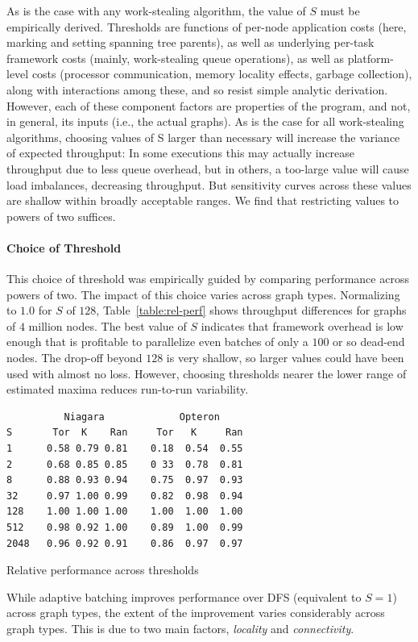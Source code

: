 As is the case with any work-stealing algorithm, the value of $S$ must
be empirically derived. Thresholds are functions of per-node
application costs (here, marking and setting spanning tree parents),
as well as underlying per-task framework costs (mainly, work-stealing
queue operations), as well as platform-level costs (processor
communication, memory locality effects, garbage collection), along
with interactions among these, and so resist simple analytic
derivation.  However, each of these component factors are properties
of the program, and not, in general, its inputs (i.e., the actual
graphs).  As is the case for all work-stealing algorithms, choosing
values of S larger than necessary will increase the variance of
expected throughput: In some executions this may actually increase
throughput due to less queue overhead, but in others, a too-large
value will cause load imbalances, decreasing throughput.  But
sensitivity curves across these values are shallow within broadly
acceptable ranges. We find that restricting values to powers of two
suffices.

\paragraph{Choice of Threshold}

This choice of threshold was empirically guided by comparing
performance across powers of two. The impact of this choice varies
across graph types. Normalizing to $1.0$ for $S$ of $128$,
Table~\ref{table:rel-perf} shows throughput differences for graphs of
$4$ million nodes.  The best value of $S$ indicates that \XWS{} framework
overhead is low enough that is profitable to parallelize even batches
of only a $100$ or so dead-end nodes. The drop-off beyond $128$ is
very shallow, so larger values could have been used with almost no
loss.  However, choosing thresholds nearer the lower range of
estimated maxima reduces run-to-run variability.

\begin{table}
{\footnotesize
\begin{verbatim}
          Niagara             Opteron
S       Tor  K    Ran     Tor   K     Ran
1      0.58 0.79 0.81    0.18  0.54  0.55
2      0.68 0.85 0.85    0 33  0.78  0.81
8      0.88 0.93 0.94    0.75  0.97  0.93
32     0.97 1.00 0.99    0.82  0.98  0.94
128    1.00 1.00 1.00    1.00  1.00  1.00
512    0.98 0.92 1.00    0.89  1.00  0.99
2048   0.96 0.92 0.91    0.86  0.97  0.97
\end{verbatim}}
\caption{Relative performance across thresholds}\label{table:rel-perf}
\end{table}
While adaptive batching improves performance over DFS (equivalent to
$S=1$) across graph types, the extent of the improvement varies
considerably across graph types. This is due to two main factors,
{\em locality} and {\em connectivity}.

